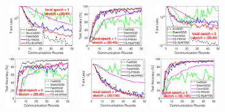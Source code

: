 \documentclass[sigconf, anonymous, review]{acmart}
\begin{document}
\begin{figure}[t]
	\begin{center}
		\mbox{\hspace{-0.15in}			   
		\includegraphics[width=0.25\textwidth]{MNIST_figures/local1_sketch20_iid0_train_loss.eps} \hspace{-0.12in}
		\includegraphics[width=0.25\textwidth]{MNIST_figures/local1_sketch20_iid0_test_acc.eps} 
		}
				\mbox{\hspace{-0.15in}		
		\includegraphics[width=0.25\textwidth]{MNIST_figures/local5_sketch20_iid0_train_loss.eps} \hspace{-0.12in}
		\includegraphics[width=0.25\textwidth]{MNIST_figures/local5_sketch20_iid0_test_acc.eps}
		}
		\mbox{\hspace{-0.15in}	
		 \includegraphics[width=0.25\textwidth]{MNIST_figures/local1_sketch50_iid0_train_loss.eps} \hspace{-0.12in}
		\includegraphics[width=0.25\textwidth]{MNIST_figures/local1_sketch50_iid0_test_acc.eps} 
}
\end{center}
\end{figure}
\end{document}
